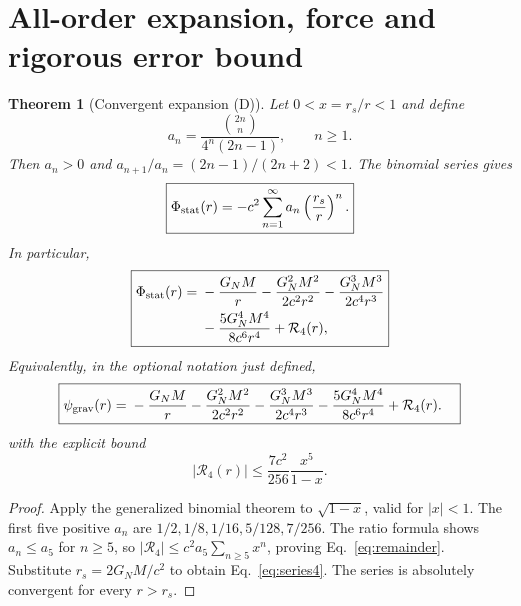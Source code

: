 \documentclass[11pt,a4paper]{article}
\newtheorem{theorem}{Theorem}[section]
\theoremstyle{remark}
\newcommand{\eref}[1]{Eq.~\eqref{#1}}
\begin{document}
\section{All-order expansion, force and rigorous error bound}\label{sec:series}
\begin{theorem}[Convergent expansion (D)]\label{thm:series}
Let $0<x=r_s/r<1$ and define
\begin{equation}\label{eq:an}
 a_n=\frac{\binom{2n}{n}}{4^n(2n-1)},\qquad n\ge1.
\end{equation}
Then $a_n>0$ and $a_{n+1}/a_n=(2n-1)/(2n+2)<1$. The binomial series gives
\begin{equation}\label{eq:allorders}
\boxed{\Phi_{\rm stat}(r)=-c^2\sum_{n=1}^{\infty}a_n\left(\frac{r_s}{r}\right)^n.}
\end{equation}
In particular,
\begin{equation}\label{eq:series4}
\boxed{\begin{aligned}
\Phi_{\rm stat}(r)={}&-\frac{G_NM}{r}
-\frac{G_N^2M^2}{2c^2r^2}
-\frac{G_N^3M^3}{2c^4r^3}\\
&-\frac{5G_N^4M^4}{8c^6r^4}+\mathcal R_4(r),
\end{aligned}}
\end{equation}
Equivalently, in the optional notation just defined,
\begin{equation}\label{eq:psi-classical-series}
\boxed{\begin{aligned}
\psi_{\rm grav}(r)={}&-\frac{G_NM}{r}
-\frac{G_N^2M^2}{2c^2r^2}
-\frac{G_N^3M^3}{2c^4r^3}
-\frac{5G_N^4M^4}{8c^6r^4}
+\mathcal R_4(r).
\end{aligned}}
\end{equation}
with the explicit bound
\begin{equation}\label{eq:remainder}
 \boxed{|\mathcal R_4(r)|\le\frac{7c^2}{256}\frac{x^5}{1-x}.}
\end{equation}
\end{theorem}
\begin{proof}
Apply the generalized binomial theorem to $\sqrt{1-x}$, valid for $|x|<1$. The first five positive $a_n$ are $1/2,1/8,1/16,5/128,7/256$. The ratio formula shows $a_n\le a_5$ for $n\ge5$, so $|\mathcal R_4|\le c^2a_5\sum_{n\ge5}x^n$, proving \eref{eq:remainder}. Substitute $r_s=2G_NM/c^2$ to obtain \eref{eq:series4}. The series is absolutely convergent for every $r>r_s$.
\end{proof}
\end{document}
